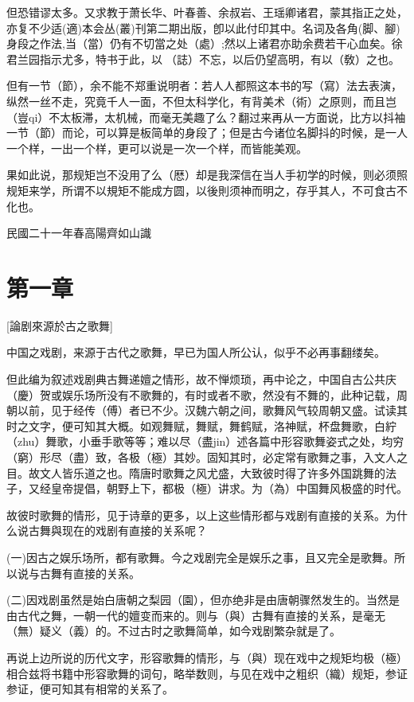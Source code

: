 \documentclass{zhvt-classic}
\begin{document}
但恐错谬太多。又求教于萧长华、叶春善、余叔岩、王瑶卿诸君，蒙其指正之处，亦复不少适(適)本会丛(叢)刊第二期出版，卽以此付印其中。名词及各角(脚、腳)身段之作法,当（當）仍有不切當之处（處）;然以上诸君亦助余费若干心血矣。徐君兰园指示尤多，特书于此，以𰵧（誌）不忘，以后仍望高明，有以（敎）之也。

但有一节（節），余不能不郑重说明者：若人人都照这本书的写（寫）法去表演，纵然一丝不走，究竟千人一面，不但太科学化，有背美术（術）之原则，而且岂（豈qi）不太板滞，太机械，而毫无美趣了么？翻过来再从一方面说，比方以抖袖一节（節）而论，可以算是板简单的身段了；但是古今诸位名脚抖的时候，是一人一个样，一出一个样，更可以说是一次一个样，而皆能美观。

果如此说，那规矩岂不没用了么（厯）却是我深信在当人手初学的时候，则必须照规矩来学，所谓不以規矩不能成方圆，以後則须神而明之，存乎其人，不可食古不化也。

民國二十一年春高陽齊如山識

\chapter*[]{第一章}[論剧來源於古之歌舞]
\begin{preface}
中国之戏剧，来源于古代之歌舞，早已为国人所公认，似乎不必再事翻缕矣。
\end{preface}

但此编为叙述戏剧典古舞递嬗之情形，故不惮烦琐，再中论之，中国自古公共庆（慶）贺或娱乐场所没有不歌舞的，有时或者不歌，然没有不舞的，此种记载，周朝以前，见于经传（傅）者已不少。汉魏六朝之间，歌舞风气较周朝又盛。试读其时之文字，便可知其大概。如观舞赋，舞赋，舞鹤赋，洛神赋，杯盘舞歌，白紵（zhu）舞歌，小垂手歌等等；难以尽（盡jin）述各篇中形容歌舞姿式之处，均穷（窮）形尽（盡）致，各极（極）其妙。固知其时，必定常有歌舞之事，入文人之目。故文人皆乐道之也。隋唐时歌舞之风尤盛，大致彼时得了许多外国跳舞的法子，又经皇帝提倡，朝野上下，都极（極）讲求。为（為）中国舞风极盛的时代。

故彼时歌舞的情形，见于诗章的更多，以上这些情形都与戏剧有直接的关系。为什么说古舞與现在的戏剧有直接的关系呢？

(一)因古之娱乐场所，都有歌舞。今之戏剧完全是娱乐之事，且又完全是歌舞。所以说与古舞有直接的关系。

(二)因戏剧虽然是始白唐朝之梨园（園），但亦绝非是由唐朝骤然发生的。当然是由古代之舞，一朝一代的嬗变而来的。则与（與）古舞有直接的关系，是毫无（無）疑义（義）的。不过古时之歌舞简单，如今戏剧繁杂就是了。

再说上边所说的历代文字，形容歌舞的情形，与（與）现在戏中之规矩均极（極）相合兹将书籍中形容歌舞的词句，略举数则，与见在戏中之粗织（織）规矩，参证参证，便可知其有相常的关系了。
\end{document}
